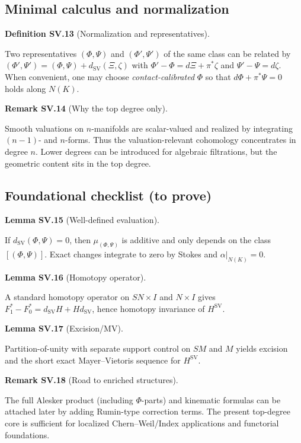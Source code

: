 \documentclass[10pt, letterpaper]{article}
\newcommand{\CustomHeading}[3]{%
  \par\medskip\noindent%
  \textbf{#1 #2} \textnormal{(#3)}.\enskip%
}
\newenvironment{DEF}[2]{\begin{unitbox}\CustomHeading{Definition}{#1}{#2}}{\end{unitbox}}
\newenvironment{LEM}[2]{\begin{unitbox}\CustomHeading{Lemma}{#1}{#2}}{\end{unitbox}}
\newenvironment{REM}[2]{\begin{unitbox}\CustomHeading{Remark}{#1}{#2}}{\end{unitbox}}
\begin{document}
\subsection{Minimal calculus and normalization}
\begin{DEF}{SV.13}{Normalization and representatives}
Two representatives $(\Phi,\Psi)$ and $(\Phi',\Psi')$ of the same class can be related by
$(\Phi',\Psi')=(\Phi,\Psi)+d_{\operatorname{SV}}(\Xi,\zeta)$ with
$\Phi'-\Phi=d\Xi+\pi^*\zeta$ and $\Psi'-\Psi=d\zeta$.
When convenient, one may choose \emph{contact-calibrated} $\Phi$ so that $d\Phi+\pi^*\Psi=0$ holds along $N(K)$.
\end{DEF}

\begin{REM}{SV.14}{Why the top degree only}
Smooth valuations on $n$-manifolds are scalar-valued and realized by integrating $(n-1)$- and $n$-forms.
Thus the valuation-relevant cohomology concentrates in degree $n$.
Lower degrees can be introduced for algebraic filtrations, but the geometric content sits in the top degree.
\end{REM}

\subsection{Foundational checklist (to prove)}
\begin{LEM}{SV.15}{Well-defined evaluation}
If $d_{\operatorname{SV}}(\Phi,\Psi)=0$, then $\mu_{(\Phi,\Psi)}$ is additive and only depends on the class $[(\Phi,\Psi)]$.
Exact changes integrate to zero by Stokes and $\alpha|_{N(K)}=0$.
\end{LEM}

\begin{LEM}{SV.16}{Homotopy operator}
A standard homotopy operator on $SN\times I$ and $N\times I$ gives
$F_1^*-F_0^*=d_{\operatorname{SV}}H+Hd_{\operatorname{SV}}$, hence homotopy invariance of $H^{\operatorname{SV}}$.
\end{LEM}

\begin{LEM}{SV.17}{Excision/MV}
Partition-of-unity with separate support control on $SM$ and $M$ yields excision and the short exact Mayer--Vietoris sequence for $H^{\operatorname{SV}}$.
\end{LEM}

\begin{REM}{SV.18}{Road to enriched structures}
The full Alesker product (including $\Phi$-parts) and kinematic formulas can be attached later
by adding Rumin-type correction terms.
The present top-degree core is sufficient for localized Chern--Weil/Index applications and functorial foundations.
\end{REM}
\end{document}
